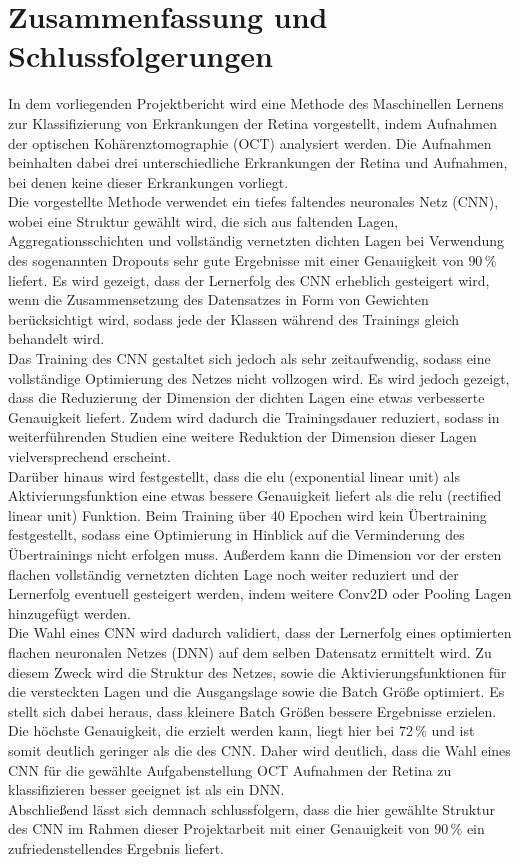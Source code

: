 \section{Zusammenfassung und Schlussfolgerungen}

In dem vorliegenden Projektbericht wird eine Methode des Maschinellen Lernens zur Klassifizierung von Erkrankungen der Retina vorgestellt, indem Aufnahmen der optischen Kohärenztomographie (OCT) analysiert werden. Die Aufnahmen beinhalten dabei drei unterschiedliche Erkrankungen der Retina und Aufnahmen, bei denen keine dieser Erkrankungen vorliegt.\\
Die vorgestellte Methode verwendet ein tiefes faltendes neuronales Netz (CNN), wobei eine Struktur gewählt wird, die sich aus faltenden Lagen, Aggregationsschichten und vollständig vernetzten dichten Lagen bei Verwendung des sogenannten Dropouts sehr gute Ergebnisse mit einer Genauigkeit von $90\,\%$ liefert. Es wird gezeigt, dass der Lernerfolg des CNN erheblich gesteigert wird, wenn die Zusammensetzung des Datensatzes in Form von Gewichten berücksichtigt wird, sodass jede der Klassen während des Trainings gleich behandelt wird. \\
Das Training des CNN gestaltet sich jedoch als sehr zeitaufwendig, sodass eine vollständige Optimierung des Netzes nicht vollzogen wird. Es wird jedoch gezeigt, dass die Reduzierung der Dimension der dichten Lagen eine etwas verbesserte Genauigkeit liefert. Zudem wird dadurch die Trainingsdauer reduziert, sodass in weiterführenden Studien eine weitere Reduktion der Dimension dieser Lagen vielversprechend erscheint. \\
Darüber hinaus wird festgestellt, dass die elu (exponential linear unit) als Aktivierungsfunktion eine etwas bessere Genauigkeit liefert als die relu (rectified linear unit) Funktion. Beim Training über 40 Epochen wird kein Übertraining festgestellt, sodass eine Optimierung in Hinblick auf die Verminderung des Übertrainings nicht erfolgen muss. Außerdem kann die Dimension vor der ersten flachen vollständig vernetzten dichten Lage noch weiter reduziert und der Lernerfolg eventuell gesteigert werden, indem weitere Conv2D oder Pooling Lagen hinzugefügt werden. \\
Die Wahl eines CNN wird dadurch validiert, dass der Lernerfolg eines optimierten flachen neuronalen Netzes (DNN) auf dem selben Datensatz ermittelt wird. Zu diesem Zweck wird die Struktur des Netzes, sowie die Aktivierungsfunktionen für die versteckten Lagen und die Ausgangslage sowie die Batch Größe optimiert. Es stellt sich dabei heraus, dass kleinere Batch Größen bessere Ergebnisse erzielen. Die höchste Genauigkeit, die erzielt werden kann, liegt hier bei $72\,\%$ und ist somit deutlich geringer als die des CNN. Daher wird deutlich, dass die Wahl eines CNN für die gewählte Aufgabenstellung OCT Aufnahmen der Retina zu klassifizieren besser geeignet ist als ein DNN. \\
Abschließend lässt sich demnach schlussfolgern, dass die hier gewählte Struktur des CNN im Rahmen dieser Projektarbeit mit einer Genauigkeit von $90\,\%$ ein zufriedenstellendes Ergebnis liefert. \\
